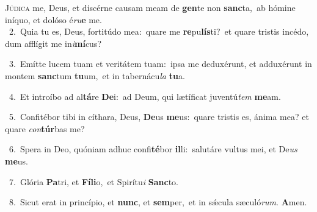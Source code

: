 \lettrine{\initial\textcolor{\initialcolor}{J}}{údica} me, Deus, et discérne causam meam de \textbf{gen}\-te non \textbf{sanc}\-ta,~\star ab hómine iníquo, et dolóso é\-\textit{ru}\-\textbf{e} me.\\
{\numbfont\textcolor{\numbcolor}{~2.}}~Quia tu es, Deus, fortitúdo mea:~\dagger quare me \textbf{re}\-pu\-\textbf{lís}\-ti?~\star et quare tristis incédo, dum afflígit me in\-\textit{i}\-\textbf{mí}cus?\par
{\numbfont\textcolor{\numbcolor}{~3.}}~Emítte lucem tuam et veritátem tuam:~\dagger ipsa me deduxérunt, et adduxérunt in montem \textbf{sanc}\-tum \textbf{tu}\-um,~\star et in tabernácu\textit{la} \textbf{tu}\-a.\par
{\numbfont\textcolor{\numbcolor}{~4.}}~Et introíbo ad al\-\textbf{tá}\-re \textbf{De}\-i:~\star ad Deum, qui lætíficat juventú\textit{tem} \textbf{me}\-am.\par
{\numbfont\textcolor{\numbcolor}{~5.}}~Confitébor tibi in cíthara, Deus, \textbf{De}\-us \textbf{me}\-us:~\star quare tristis es, ánima mea? et quare \textit{con}\-\textbf{túr}bas me?\par
{\numbfont\textcolor{\numbcolor}{~6.}}~Spera in Deo, quóniam adhuc confi\-\textbf{té}\-bor \textbf{il}\-li:~\star salutáre vultus mei, et De\textit{us} \textbf{me}\-us.\par
{\numbfont\textcolor{\numbcolor}{~7.}}~Glória \textbf{Pa}\-tri, et \textbf{Fí}\-\textbf{li}o,~\star et Spirítu\textit{i} \textbf{Sanc}\-to.\par
{\numbfont\textcolor{\numbcolor}{~8.}}~Sicut erat in princípio, et \textbf{nunc}\-, et \textbf{sem}\-per,~\star et in sǽcula sæculó\-\textit{rum}\-. \textbf{A}\-men.\par
